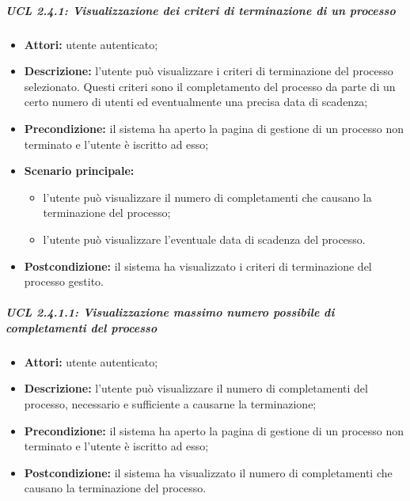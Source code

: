 \subparagraph{UCL 2.4.1: Visualizzazione dei criteri di terminazione di un processo}
\begin{itemize}
\item \textbf{Attori:} utente autenticato;
\item \textbf{Descrizione:} l'utente può visualizzare i criteri di terminazione del processo selezionato. Questi criteri sono il completamento del processo da parte di un certo numero di utenti ed eventualmente una precisa data di scadenza;
\item \textbf{Precondizione:} il sistema ha aperto la pagina di gestione di un processo non terminato e l'utente è iscritto ad esso;
\item \textbf{Scenario principale:}
\begin{itemize}
\item l'utente può visualizzare il numero di completamenti che causano la terminazione del processo;
\item l'utente può visualizzare l'eventuale data di scadenza del processo.
\end{itemize}
\item \textbf{Postcondizione:} il sistema ha visualizzato i criteri di terminazione del processo gestito.
\end{itemize}

\subparagraph{UCL 2.4.1.1: Visualizzazione massimo numero possibile di completamenti del processo}
\begin{itemize}
\item \textbf{Attori:} utente autenticato;
\item \textbf{Descrizione:} l'utente può visualizzare il numero di completamenti del processo, necessario e sufficiente a causarne la terminazione;
\item \textbf{Precondizione:} il sistema ha aperto la pagina di gestione di un processo non terminato e l'utente è iscritto ad esso;
\item \textbf{Postcondizione:} il sistema ha visualizzato il numero di completamenti che causano la terminazione del processo.
\end{itemize}

